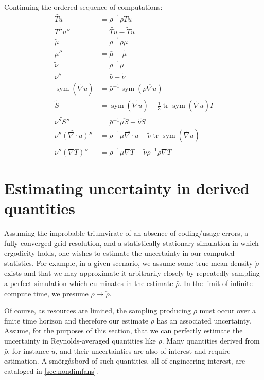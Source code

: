 \documentclass[letterpaper,11pt,nointlimits,reqno,draft]{amsbook}
\newcommand{\symmetricpart}[1]
  {\ensuremath{\operatorname{sym}\left(#1\right)}}
\DeclareMathOperator{\trace}{tr}
\begin{document}
Continuing the ordered sequence of computations:
{ \allowdisplaybreaks[1]
\begin{align}
  \widetilde{Tu} &= \bar{\rho}^{-1} \overline{\rho{}Tu}
\\
  \widetilde{T''u''} &= \widetilde{Tu} - \tilde{T}\tilde{u}
\\
  \tilde{\mu} &= \bar{\rho}^{-1} \overline{\rho\mu}
\\
  \overline{\mu''} &= \bar{\mu} - \tilde{\mu}
\\
  \tilde{\nu} &= \bar{\rho}^{-1} \bar{\mu}
\\
  \overline{\nu''} &= \bar{\nu} - \tilde{\nu}
\\
  \symmetricpart{\widetilde{\nabla{}u}}
  &= \bar{\rho}^{-1} \symmetricpart{\overline{\rho\nabla{}u}}
\\
  \tilde{S} &= \symmetricpart{\widetilde{\nabla{}u}}
   - \frac{1}{3} \trace\symmetricpart{\widetilde{\nabla{}u}} I
\\
  \widetilde{\nu''S''}
  &= \bar{\rho}^{-1} \overline{\mu{}S} - \tilde{\nu}\tilde{S}
\\
  \widetilde{\nu''\left(\nabla\cdot{}u\right)''}
  &= \bar{\rho}^{-1} \overline{\mu\nabla\cdot{}u}
   - \tilde{\nu}\trace\symmetricpart{\widetilde{\nabla{}u}}
\\
  \widetilde{\nu''\left(\nabla{}T\right)''}
  &= \bar{\rho}^{-1} \overline{\mu\nabla{}T}
   - \tilde{\nu} \bar{\rho}^{-1} \overline{\rho\nabla{}T}
\end{align}
}

\section{Estimating uncertainty in derived quantities}

Assuming the improbable triumvirate of an absence of coding/usage errors, a
fully converged grid resolution, and a statistically stationary simulation in
which ergodicity holds, one wishes to estimate the uncertainty in our computed
statistics.  For example, in a given scenario, we assume some true mean density
$\check{\rho}$ exists and that we may approximate it arbitrarily closely by
repeatedly sampling a perfect simulation which culminates in the estimate
$\bar{\rho}$.   In the limit of infinite compute time, we presume
$\bar{\rho}\to\check{\rho}$.

Of course, as resources are limited, the sampling producing $\bar{\rho}$ must
occur over a finite time horizon and therefore our estimate $\bar{\rho}$ has an
associated uncertainty.  Assume, for the purposes of this section, that we can
perfectly estimate the uncertainty in Reynolds-averaged quantities like
$\bar{\rho}$.  Many quantities derived from $\bar{\rho}$, for instance
$\tilde{u}$, and their uncertainties are also of interest and require
estimation.  A sm\"{o}rg\r{a}sbord of such quantities, all of engineering
interest, are cataloged in \autoref{sec:nondimfans}.
\end{document}
